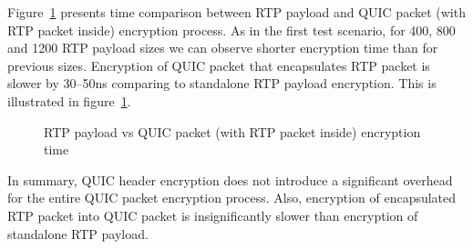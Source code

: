 Figure~\ref{fig:rtp-payload-quic-packet-enc} presents time comparison between RTP payload and QUIC packet (with RTP packet inside) encryption process.
As in the first test scenario, for 400, 800 and 1200 RTP payload sizes we can observe shorter encryption time than for previous sizes.
Encryption of QUIC packet that encapsulates RTP packet is slower by 30--50ns comparing to standalone RTP payload encryption.
This is illustrated in figure~\ref{fig:rtp-payload-quic-packet-enc}.

\begin{figure}[h]
    \centering
    \caption{RTP payload vs QUIC packet (with RTP packet inside) encryption time}
    \label{fig:rtp-payload-quic-packet-enc}
\end{figure}

In summary, QUIC header encryption does not introduce a significant overhead for the entire QUIC packet encryption process.
Also, encryption of encapsulated RTP packet into QUIC packet is insignificantly slower than encryption of standalone RTP payload.

